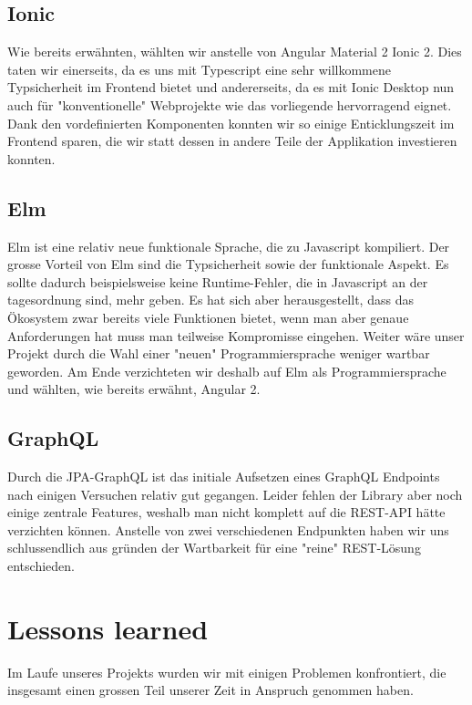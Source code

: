 \documentclass[11pt]{article} %
\begin{document}
\subsection{Ionic}
Wie bereits erwähnten, wählten wir anstelle von Angular Material 2 Ionic 2. Dies taten wir einerseits, da es uns mit Typescript eine sehr willkommene Typsicherheit im Frontend bietet und andererseits, da es mit Ionic Desktop nun auch für "konventionelle" Webprojekte wie das vorliegende hervorragend eignet. Dank den vordefinierten Komponenten konnten wir so einige Enticklungszeit im Frontend sparen, die wir statt dessen in andere Teile der Applikation investieren konnten.

\subsection{Elm}
Elm ist eine relativ neue funktionale Sprache, die zu Javascript kompiliert. Der grosse Vorteil von Elm sind die Typsicherheit sowie der funktionale Aspekt. Es sollte dadurch beispielsweise keine Runtime-Fehler, die in Javascript an der tagesordnung sind, mehr geben.
Es hat sich aber herausgestellt, dass das Ökosystem zwar bereits viele Funktionen bietet, wenn man aber genaue Anforderungen hat muss man teilweise Kompromisse eingehen.
Weiter wäre unser Projekt durch die Wahl einer "neuen" Programmiersprache weniger wartbar geworden. Am Ende verzichteten wir deshalb auf Elm als Programmiersprache und wählten, wie bereits erwähnt, Angular 2.

\subsection{GraphQL}
Durch die JPA-GraphQL ist das initiale Aufsetzen eines GraphQL Endpoints nach einigen Versuchen relativ gut gegangen. Leider fehlen der Library aber noch einige zentrale Features, weshalb man nicht komplett auf die REST-API hätte verzichten können. Anstelle von zwei verschiedenen Endpunkten haben wir uns schlussendlich aus gründen der Wartbarkeit für eine "reine" REST-Lösung entschieden.

\newpage
\section{Lessons learned}
Im Laufe unseres Projekts wurden wir mit einigen Problemen konfrontiert, die insgesamt einen grossen Teil unserer Zeit in Anspruch genommen haben.
\end{document}
